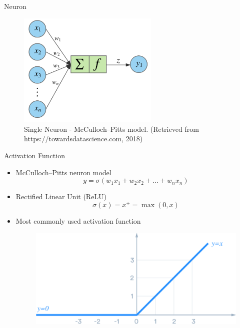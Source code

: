 \documentclass[11pt,t]{beamer}
\begin{document}
\begin{frame}{Neuron}
\begin{figure}
	\centering
	\includegraphics[width=0.6\textwidth]{neuron}
	\caption{Single Neuron - McCulloch–Pitts model. (Retrieved from https://towardsdatascience.com, 2018)}
	\end{figure}
\end{frame}

\begin{frame}{Activation Function}
   \begin{itemize}
      \item McCulloch–Pitts neuron model
      \begin{equation*}
      y = \sigma(w_1x_1+w_2x_2+...+w_nx_n)
      \end{equation*}
      \item Rectified Linear Unit (ReLU)
      \begin{equation*}
      \sigma(x) = x^+ = \max(0,x)
      \end{equation*}
      \item Most commonly used activation function
      \begin{figure}
	   \centering
	   \includegraphics[height=0.3\textheight]{relu}
	   \end{figure}
   \end{itemize}

\end{frame}
\end{document}
